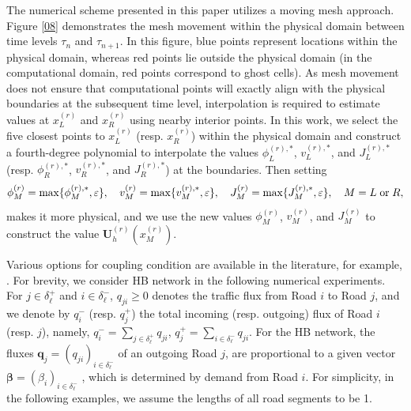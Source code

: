 \documentclass[times,final,11pt]{elsarticle}
\numberwithin{equation}{section}
\theoremstyle{definition}
\theoremstyle{remark}
\newcommand{\BU}{\mathbf{U}}
\begin{document}
The numerical scheme presented in this paper utilizes a moving mesh approach. Figure \ref{08} demonstrates the mesh movement within the physical domain between time levels $\tau_n$ and $\tau_{n+1}$. 
In this figure, blue points represent locations within the physical domain, whereas red points lie outside the physical domain (in the computational domain, red points correspond to ghost cells). 
As mesh movement does not ensure that computational points will exactly align with the physical boundaries 
at the subsequent time level, interpolation is required to estimate values at $x_L^{(r)}$ and $x_R^{(r)}$ using nearby interior points. 
In this work, we select the five closest points to $x_L^{(r)}$  (resp. $x_R^{(r)}$) within the physical domain and construct a fourth-degree polynomial to interpolate the values $\phi_L^{(r),*}$, $v_L^{(r),*}$, and $J_L^{(r),*}$ (resp. $\phi_R^{(r),*}$, $v_R^{(r),*}$, and $J_R^{(r),*}$) at the boundaries. Then setting
\begin{equation*}
	\phi_M^{(r)} = \max \{\phi_M^{(r),*}, \varepsilon \}, \quad v_M^{(r)} = \max \{v_M^{(r),*}, \varepsilon \}, \quad J_M^{(r)} = \max \{J_M^{(r),*}, \varepsilon \}, \quad M = L \; {\rm or} \; R,
\end{equation*}
makes it more physical, and we use the new values $\phi_M^{(r)}$, $v_M^{(r)}$, and $J_M^{(r)}$ to construct the value $\BU^{(r)}_h \left(x_M^{(r)} \right)$.

Various options for coupling condition are available in the literature, for example, \cite{garavello2006traffic,herty2006coupling,herty2006optimization,haut2007second,gottlich2021second}. 
For brevity, we consider HB network \cite{haut2007second} in the following numerical experiments.
For $j \in \delta_\ell^+$ and $i \in \delta_\ell^-$, $q_{ji} \geq 0$ denotes the traffic flux from Road $i$ to Road $j$, and we denote by $q_i^{-}$ (resp. $q_j^+$) the total incoming (resp. outgoing) flux of Road $i$ (resp. $j$), namely, $q_i^- = \sum_{j \in \delta_\ell^+} q_{ji}$, $q_j^+ = \sum_{i \in \delta_\ell^-} q_{ji}$.
For the HB network, the fluxes $\mathbf{q}_j = (q_{ji})_{i \in \delta_\ell^-}$ of an outgoing Road $j$, are proportional to a given vector $\boldsymbol{\beta} = (\beta_i)_{i \in \delta_\ell^-}$ , which is determined by demand from Road $i$.
For simplicity, in the following examples, we assume the lengths of all road segments to be 1.
\end{document}
